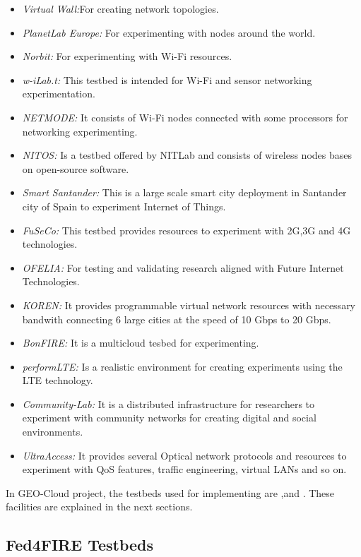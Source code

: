 \begin{itemize}
\begin{itemize}
\item \emph{Virtual Wall:}For creating network topologies. 
\item \emph{PlanetLab Europe:} For experimenting with nodes around the world.
\item \emph{Norbit:} For experimenting with Wi-Fi resources.
\item \emph{w-iLab.t:} This testbed is intended for Wi-Fi and sensor networking experimentation.
\item \emph{NETMODE:} It consists of Wi-Fi nodes connected with some processors
  for networking experimenting.
\item \emph{NITOS:} Is a testbed offered by NITLab and consists of wireless
  nodes bases on open-source software. 
\item \emph{Smart Santander:} This is a large scale smart city deployment in
  Santander city of Spain to experiment Internet of Things. 
\item \emph{FuSeCo:} This testbed provides resources to experiment with 2G,3G
  and 4G technologies.
\item \emph{OFELIA:} For testing and validating research aligned
  with Future Internet Technologies.
\item \emph{KOREN:} It provides programmable virtual network resources with
  necessary bandwith connecting 6 large cities at the speed of 10 Gbps to 20 Gbps. 
\item \emph{BonFIRE:} It is a multicloud tesbed for experimenting.
\item \emph{performLTE:} Is a realistic environment for creating experiments
  using the LTE technology.
\item \emph{Community-Lab:} It is a distributed infrastructure for researchers
  to experiment with community networks for creating digital and social environments.
\item \emph{UltraAccess:} It provides several Optical network protocols and
  resources to experiment with \ac{QoS} features, traffic engineering, virtual LANs
  and so on.
\end{itemize}
\end{itemize}

In GEO-Cloud project, the testbeds used for implementing are \vw,\pl and
\bonfire. These facilities are explained in the next sections.

\subsection{Fed4FIRE Testbeds}

